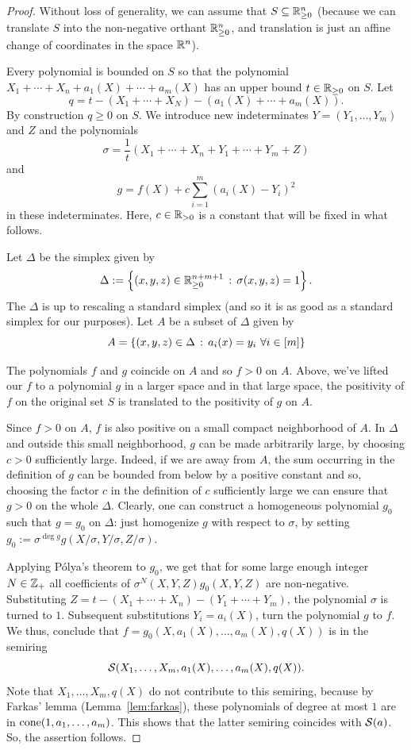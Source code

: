 \begin{proof}
	Without loss of generality, we can assume that $S \subseteq \mathbb{R}_{\ge 0}^n$ (because we can translate $S$ into the non-negative orthant $\mathbb{R}_{\ge 0}^n$, and translation is just an affine change of coordinates in the space $\mathbb{R}^n$). 
	
	Every polynomial is bounded on $S$ so that the polynomial $X_1 + \cdots + X_n + a_1(X) + \cdots +a_m(X)$ has an upper bound $t \in \mathbb{R}_{\ge 0}$ on $S$. Let 
	\[
		q = t - (X_1 + \cdots + X_N) - (a_1(X) + \cdots + a_m(X)).
	\] 
	By construction $q \ge 0$ on $S$. We introduce new indeterminates $Y = (Y_1,\ldots,Y_m)$ and $Z$ and the polynomials 
	\[
		\sigma = \frac{1}{t} ( X_1 + \cdots + X_n + Y_1 + \cdots +Y_m + Z)
	\]
	and
	\[
		g = f(X) + c \sum_{i=1}^m (a_i(X) - Y_i)^2
	\]
	in these indeterminates. Here, $c \in \mathbb{R}_{>0}$ is a constant that will be fixed in what follows. 
	
	Let $\Delta$ be the simplex given by 
	\[
		\Delta:=\left\{ (x,y,z) \in \mathbb{R}_{\ge 0}^{n+m+1} \,:\, \sigma(x,y,z) = 1 \right\}.
	\]
	The $\Delta$ is up to rescaling a standard simplex (and so it is as good as a standard simplex for our purposes).
	Let $A$ be a subset of $\Delta$ given by 
	\[
		A = \left\{ (x,y,z) \in \Delta \,:\, a_i(x) = y_i \ \forall i \in [m] \right\}
	\]
	
	The polynomials $f$ and $g$ coincide on $A$ and so $f > 0$ on $A$. Above, we've lifted our $f$ to a polynomial $g$ in a larger space and in that large space, the positivity of $f$ on the original set $S$ is translated to the positivity of $g$ on $A$. 
	
	Since $f > 0$ on $A$, $f$ is also positive on a small compact neighborhood of $A$. In $\Delta$ and outside this small neighborhood, $g$ can be made arbitrarily large, by choosing $c>0$ sufficiently large. Indeed, if we are away from $A$, the sum occurring in the definition of $g$ can be bounded from below by a positive constant and so, choosing the factor $c$ in the definition of $c$ sufficiently large we can ensure that $g> 0$ on the whole $\Delta$. Clearly, one can construct a homogeneous polynomial $g_0$ such that $g=g_0$ on $\Delta$: just homogenize $g$ with respect to $\sigma$, by setting $g_0 := \sigma^{\deg g} g( X / \sigma, Y / \sigma, Z / \sigma)$. 
	
	Applying P\'olya's theorem to $g_0$, we get that for some large enough integer $N \in \mathbb{Z}_+$ all coefficients of $\sigma^N(X,Y,Z) g_0(X,Y,Z) $ are non-negative. Substituting $Z = t - (X_1 + \cdots + X_n) - (Y_1 + \cdots + Y_m)$, the polynomial $\sigma$ is turned to $1$. Subsequent substitutions $Y_i = a_i(X)$, turn the polynomial $g$ to $f$. We thus, conclude that
	$f = g_0(X,a_1(X),\ldots,a_m(X), q(X))$ is in the semiring  \[
		\mathcal{S}(X_1,\ldots,X_m,a_1(X),\ldots,a_m(X),q(X)).
	\] Note that $X_1,\ldots,X_m, q(X)$ do not contribute to this semiring, because by Farkas' lemma (Lemma~\ref{lem:farkas}), these polynomials of degree at most $1$ are in $\operatorname{cone}(1,a_1,\ldots,a_m)$. This shows that the latter semiring coincides with $\mathcal{S}(a)$. So, the assertion follows.
\end{proof}

